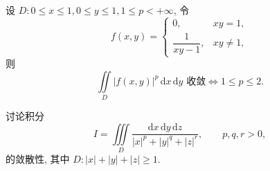 \documentclass[../../数学分析培优讲义.tex]{subfiles}
\begin{document}
\begin{example}
设 $D:0\leq x\leq1,0\leq y\leq1,1\leq p<+\infty$, 令
\[
    f(x,y)=
    \begin{cases}
        0,&xy=1,\\
        \dfrac{1}{xy-1},&xy\ne1,
    \end{cases}
\]
则
\[
    \iint\limits_D|f(x,y)|^p\,\mathrm{d}x\,\mathrm{d}y\text{ 收敛}
    \iff1\leq p\leq2.
\]
\end{example}
\exampleblank

\begin{example}
讨论积分
\[
    I=\iiint\limits_D\dfrac{\mathrm{d}x\,\mathrm{d}y\,\mathrm{d}z}{|x|^p+|y|^q+|z|^r},
    \qquad p,q,r>0,
\]
的敛散性, 其中 $D:|x|+|y|+|z|\geq1$.
\end{example}
\exampleblank
\end{document}
